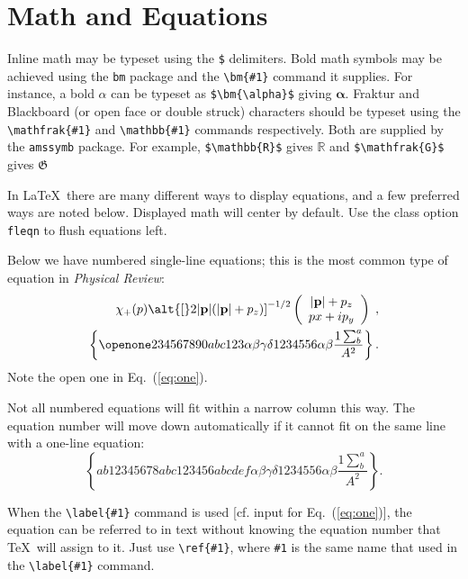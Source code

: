 \documentclass[%
reprint,
amsmath,amssymb,
aps,
]{revtex4-2}
\begin{document}
	\section{Math and Equations}
	Inline math may be typeset using the \verb+$+ delimiters. Bold math
	symbols may be achieved using the \verb+bm+ package and the
	\verb+\bm{#1}+ command it supplies. For instance, a bold $\alpha$ can
	be typeset as \verb+$\bm{\alpha}$+ giving $\bm{\alpha}$. Fraktur and
	Blackboard (or open face or double struck) characters should be
	typeset using the \verb+\mathfrak{#1}+ and \verb+\mathbb{#1}+ commands
	respectively. Both are supplied by the \texttt{amssymb} package. For
	example, \verb+$\mathbb{R}$+ gives $\mathbb{R}$ and
	\verb+$\mathfrak{G}$+ gives $\mathfrak{G}$
	
	In \LaTeX\ there are many different ways to display equations, and a
	few preferred ways are noted below. Displayed math will center by
	default. Use the class option \verb+fleqn+ to flush equations left.
	
	Below we have numbered single-line equations; this is the most common
	type of equation in \textit{Physical Review}:
	\begin{eqnarray}
		\chi_+(p)\alt{\bf [}2|{\bf p}|(|{\bf p}|+p_z){\bf ]}^{-1/2}
		\left(
		\begin{array}{c}
			|{\bf p}|+p_z\\
			px+ip_y
		\end{array}\right)\;,
		\\
		\left\{%
		\openone234567890abc123\alpha\beta\gamma\delta1234556\alpha\beta
		\frac{1\sum^{a}_{b}}{A^2}%
		\right\}%
		\label{eq:one}.
	\end{eqnarray}
	Note the open one in Eq.~(\ref{eq:one}).
	
	Not all numbered equations will fit within a narrow column this
	way. The equation number will move down automatically if it cannot fit
	on the same line with a one-line equation:
	\begin{equation}
		\left\{
		ab12345678abc123456abcdef\alpha\beta\gamma\delta1234556\alpha\beta
		\frac{1\sum^{a}_{b}}{A^2}%
		\right\}.
	\end{equation}
	
	When the \verb+\label{#1}+ command is used [cf. input for
	Eq.~(\ref{eq:one})], the equation can be referred to in text without
	knowing the equation number that \TeX\ will assign to it. Just
	use \verb+\ref{#1}+, where \verb+#1+ is the same name that used in
	the \verb+\label{#1}+ command.
	
\end{document}
